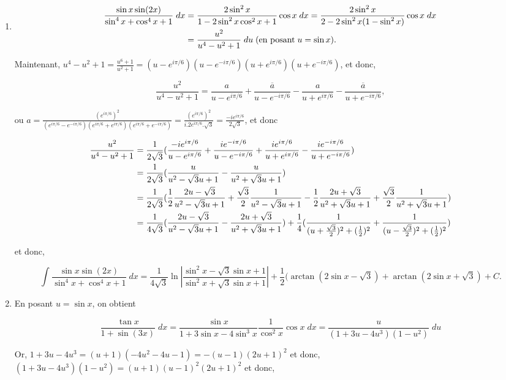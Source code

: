 \documentclass[11pt,a4paper]{article}
\newcommand{\Arctan}{\mathop{\mathrm{arctan}}\nolimits}
\begin{document}
\begin{enumerate}
\item \begin{align*}\ensuremath
\frac{\sin x\sin(2x)}{\sin^4x+\cos^4x+1}\;dx&=\frac{2\sin^2x}{1-2\sin^2x\cos^2x+1}\cos x\;dx=\frac{2\sin^2x}{2-2\sin^2x(1-\sin^2x)}\cos x\;dx\\
 &=\frac{u^2}{u^4-u^2+1}\;du\;(\mbox{en posant}\;u=\sin x).
\end{align*}

Maintenant, $u^4-u^2+1=\frac{u^6+1}{u^2+1}=(u-e^{i\pi/6})(u-e^{-i\pi/6})(u+e^{i\pi/6})(u+e^{-i\pi/6})$, et donc,

$$\frac{u^2}{u^4-u^2+1}=\frac{a}{u-e^{i\pi/6}}+\frac{\overline{a}}{u-e^{-i\pi/6}}-\frac{a}{u+e^{i\pi/6}}-\frac{\overline{a}}{u+e^{-i\pi/6}},$$

ou $a=\frac{(e^{i\pi/6})^2}{(e^{i\pi/6}-e^{-i\pi/6})(e^{i\pi/6}+e^{i\pi/6})(e^{i\pi/6}+e^{-i\pi/6})}=
\frac{(e^{i\pi/6})^2}{i.2e^{i\pi/6}.\sqrt{3}}=\frac{-ie^{i\pi/6}}{2\sqrt{3}}$, et donc

\begin{align*}\ensuremath
\frac{u^2}{u^4-u^2+1}&=\frac{1}{2\sqrt{3}}(\frac{-ie^{i\pi/6}}{u-e^{i\pi/6}}+\frac{ie^{-i\pi/6}}{u-e^{-i\pi/6}}+\frac{ie^{i\pi/6}}{u+e^{i\pi/6}}-\frac{ie^{-i\pi/6}}{u+e^{-i\pi/6}})\\
 &=\frac{1}{2\sqrt{3}}(\frac{u}{u^2-\sqrt{3}u+1}-\frac{u}{u^2+\sqrt{3}u+1})\\
 &=\frac{1}{2\sqrt{3}}(\frac{1}{2}\frac{2u-\sqrt{3}}{u^2-\sqrt{3}u+1}+\frac{\sqrt{3}}{2}\frac{1}
 {u^2-\sqrt{3}u+1}-\frac{1}{2}\frac{2u+\sqrt{3}}{u^2+\sqrt{3}u+1}+\frac{\sqrt{3}}{2}\frac{1}{u^2+\sqrt{3}u+1})\\
 &=\frac{1}{4\sqrt{3}}(\frac{2u-\sqrt{3}}{u^2-\sqrt{3}u+1}-\frac{2u+\sqrt{3}}{u^2+\sqrt{3}u+1})
 +\frac{1}{4}(\frac{1}{(u+\frac{\sqrt{3}}{2})^2+(\frac{1}{2})^2}+
 \frac{1}{(u-\frac{\sqrt{3}}{2})^2+(\frac{1}{2})^2})
\end{align*}

et donc,

$$\int_{}^{}\frac{\sin x\sin(2x)}{\sin^4x+\cos^4x+1}\;dx=\frac{1}{4\sqrt{3}}\ln\left|
\frac{\sin^2x-\sqrt{3}\sin x+1}{\sin^2x+\sqrt{3}\sin x+1}\right|+\frac{1}{2}(\Arctan(2\sin x-\sqrt{3})+\Arctan(2\sin x+\sqrt{3})+C.$$

\item  En posant $u=\sin x$, on obtient 

$$\frac{\tan x}{1+\sin(3x)}\;dx=\frac{\sin x}{1+3\sin x-4\sin^3x}\frac{1}{\cos^2x}\cos x\;dx=\frac{u}{(1+3u-4u^3)(1-u^2)}\;du$$

Or, $1+3u-4u^3=(u+1)(-4u^2-4u-1)=-(u-1)(2u+1)^2$ et donc, $(1+3u-4u^3)(1-u^2)=(u+1)(u-1)^2(2u+1)^2$ et donc,


\end{enumerate}
\end{document}
